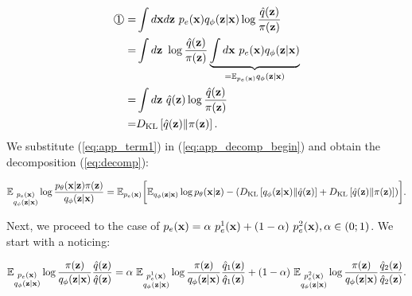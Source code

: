 \begin{equation}
\label{eq:app_term1}
    \begin{aligned}
     \raisebox{.5pt}{\textcircled{\raisebox{-.9pt} {\text{\ttfamily \normalfont 1}}}} 
     = &\int d\rvx d\rvz~p_{e}(\rvx)q_{\phi}(\rvz|\rvx) \log\dfrac{\hat{q}(\rvz)}{\pi(\rvz)} \\
     = &\int d\rvz~ \log\dfrac{\hat{q}(\rvz)}{\pi(\rvz)}\underbrace{\int d\rvx~p_{e}(\rvx)q_{\phi}(\rvz|\rvx)}_{=\E_{p_{e}(\rvx)}q_{\phi}(\rvz|\rvx)} \\
     = & \int d\rvz~\hat{q}(\rvz)\log\dfrac{\hat{q}(\rvz)}{\pi(\rvz)} \\
     = & \KL{\hat{q}(\rvz)}{\pi(\rvz)}.
    \end{aligned}
\end{equation}
We substitute (\ref{eq:app_term1}) in (\ref{eq:app_decomp_begin})
and obtain the decomposition (\ref{eq:decomp}):
\begin{fullwidth}
\begin{equation}
\begin{aligned}
     \mathbb{E}_{\substack{p_{e}({\mathbf{x}})\\q_{\phi}({\mathbf{z}}|{\mathbf{x}})}}\log \dfrac{p_{\theta}({\mathbf{x}}|{\mathbf{z}})\pi({\mathbf{z}})}{q_{\phi}({\mathbf{z}}|{\mathbf{x}})} 
    =  \mathbb{E}_{p_{e}({\mathbf{x}})}\biggl[\mathbb{E}_{q_{\phi}({\mathbf{z}}|{\mathbf{x}})}\log p_{\theta}({\mathbf{x}}|{\mathbf{z}}) 
       -  \left(D_{\mathrm{KL}}\left[q_{\phi}({\mathbf{z}}|{\mathbf{x}})\|\hat{q}({\mathbf{z}})\right]+ D_{\mathrm{KL}}\left[\hat{q}({\mathbf{z}})\|\pi({\mathbf{z}})\right]\right)\biggr].
    \end{aligned}
\end{equation}
\end{fullwidth}
	
Next, we proceed to the case of $p_{e}({\mathbf{x}}) = \alpha~p_{e}^{1}({\mathbf{x}}) + (1-\alpha)~p_{e}^{2}({\mathbf{x}}), \alpha\in(0;1)$. We start with a noticing:
\begin{fullwidth}
\begin{equation}
    \begin{aligned}
    \mathbb{E}_{\substack{p_{e}({\mathbf{x}})\\q_{\phi}({\mathbf{z}}|{\mathbf{x}})}}\log\dfrac{\pi({\mathbf{z}})}{q_{\phi}({\mathbf{z}}|{\mathbf{x}})}\dfrac{\hat{q}({\mathbf{z}})}{\hat{q}({\mathbf{z}})}  
   =  \alpha~\mathbb{E}_{\substack{p^{1}_{e}({\mathbf{x}})\\q_{\phi}({\mathbf{z}}|{\mathbf{x}})}}\log\dfrac{\pi({\mathbf{z}})}{q_{\phi}({\mathbf{z}}|{\mathbf{x}})}\dfrac{\hat{q}_{1}({\mathbf{z}})}{\hat{q}_{1}({\mathbf{z}})} + (1-\alpha) ~\mathbb{E}_{\substack{p^{2}_{e}({\mathbf{x}})\\q_{\phi}({\mathbf{z}}|{\mathbf{x}})}}\log\dfrac{\pi({\mathbf{z}})}{q_{\phi}({\mathbf{z}}|{\mathbf{x}})}\dfrac{\hat{q}_{2}({\mathbf{z}})}{\hat{q}_{2}({\mathbf{z}})}.
    \end{aligned}
\end{equation}
\end{fullwidth}
	
